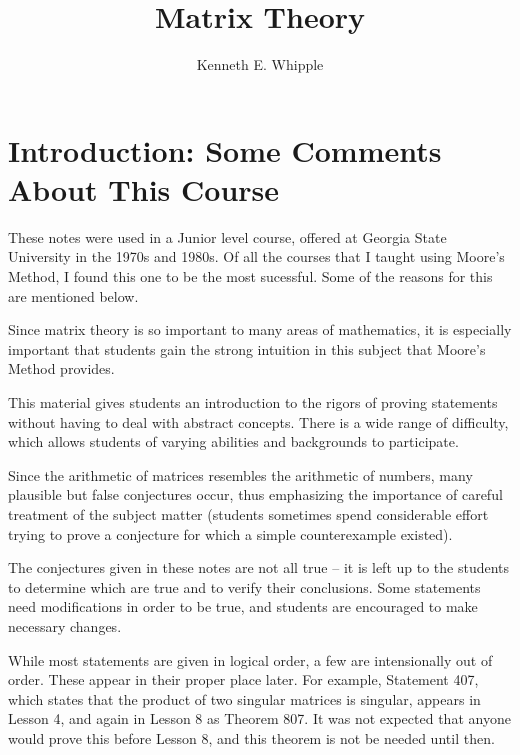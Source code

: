 \documentclass{article}
\let\titlepageAuthor\author
\renewcommand{\author}[1]{\newcommand{\headerAuthor}{#1}\titlepageAuthor{#1}}
\let\titlepageTitle\title
\renewcommand{\title}[1]{\newcommand{\headerTitle}{#1}\titlepageTitle{#1}}
\begin{document}
\title{Matrix Theory}
\author{Kenneth E. Whipple}
\date{}
\maketitle
\thispagestyle{empty}



\newpage

\setcounter{tocdepth}{3} 
\tableofcontents
\thispagestyle{empty}


\newpage

\section*{Introduction: Some Comments About This Course}


These notes were used in a Junior level course, offered at Georgia State University in the 1970s and 1980s. Of all the courses that I taught using Moore's Method, I found this one to be the most sucessful. Some of the reasons for this are mentioned below.

Since matrix theory is so important to many areas of mathematics, it is especially important that students gain the strong intuition in this subject that Moore's Method provides.

This material gives students an introduction to the rigors of proving statements without having to deal with abstract concepts. There is a wide range of difficulty, which allows students of varying abilities and backgrounds to participate.

Since the arithmetic of matrices resembles the arithmetic of numbers, many plausible but false conjectures occur, thus emphasizing the importance of careful treatment of the subject matter (students sometimes spend considerable effort trying to prove a conjecture for which a simple counterexample existed).

The conjectures given in these notes are not all true -- it is left up to the students to determine which are true and to verify their conclusions. Some statements need modifications in order to be true, and students are encouraged to make necessary changes.

While most statements are given in logical order, a few are intensionally out of order. These appear in their proper place later. For example, Statement 407, which states that the product of two singular matrices is singular, appears in Lesson 4, and again in Lesson 8 as Theorem 807. It was not expected that anyone would prove this before Lesson 8, and this theorem is not be needed until then.
\end{document}
